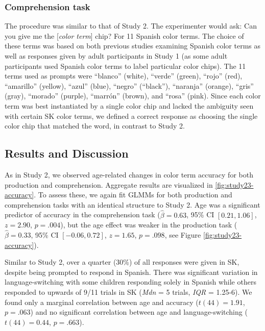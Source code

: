 \documentclass[
  english,
  ,apa7,floatsintext]{apa6}
\begin{document}
\hypertarget{comprehension-task-1}{%
\subsubsection{Comprehension task}\label{comprehension-task-1}}

The procedure was similar to that of Study 2. The experimenter would ask: Can you give me the {[}\emph{color term}{]} chip? For 11 Spanish color terms. The choice of these terms was based on both previous studies examining Spanish color terms as well as responses given by adult participants in Study 1 (as some adult participants used Spanish color terms to label particular color chips). The 11 terms used as prompts were ``blanco'' (white), ``verde'' (green), ``rojo'' (red), ``amarillo'' (yellow), ``azul'' (blue), ``negro'' (``black''), ``naranja'' (orange), ``gris'' (gray), ``morado'' (purple), ``marrón'' (brown), and ``rosa'' (pink). Since each color term was best instantiated by a single color chip and lacked the ambiguity seen with certain SK color terms, we defined a correct response as choosing the single color chip that matched the word, in contrast to Study 2.

\hypertarget{results-and-discussion-2}{%
\subsection{Results and Discussion}\label{results-and-discussion-2}}

As in Study 2, we observed age-related changes in color term accuracy for both production and comprehension. Aggregate results are visualized in \ref{fig:study23-accuracy}. To assess these, we again fit GLMMs for both production and comprehension tasks with an identical structure to Study 2. Age was a significant predictor of accuracy in the comprehension task (\(\hat{\beta} = 0.63\), 95\% CI \([0.21, 1.06]\), \(z = 2.90\), \(p = .004\)), but the age effect was weaker in the production task (\(\hat{\beta} = 0.33\), 95\% CI \([-0.06, 0.72]\), \(z = 1.65\), \(p = .098\), see Figure \ref{fig:study23-accuracy}).

Similar to Study 2, over a quarter (30\%) of all responses were given in SK, despite being prompted to respond in Spanish. There was significant variation in language-switching with some children responding solely in Spanish while others responded to upwards of 9/11 trials in SK (\emph{Mdn} = 5 trials, \emph{IQR} = 1.25-6). We found only a marginal correlation between age and accuracy (\(t(44) = 1.91\), \(p = .063\)) and no significant correlation between age and language-switching (\(t(44) = 0.44\), \(p = .663\)).
\end{document}
